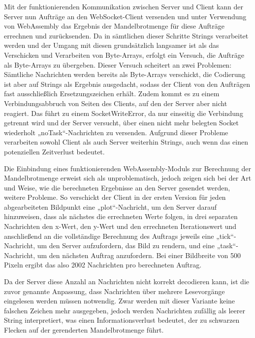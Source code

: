 \documentclass[12pt, onecolumn, notitlepage]{scrartcl}
\begin{document}
Mit der funktionierenden Kommunikation zwischen Server und Client kann der Server nun Aufträge an den WebSocket-Client versenden und unter Verwendung von WebAssembly das Ergebnis der Mandelbrotmenge für diese Aufträge errechnen und zurücksenden. Da in sämtlichen dieser Schritte Strings verarbeitet werden und der Umgang mit diesen grundsätzlich langsamer ist als das Verschicken und Verarbeiten von Byte-Arrays, erfolgt ein Versuch, die Aufträge als Byte-Arrays zu übergeben. Dieser Versuch scheitert an zwei Problemen: Sämtliche Nachrichten werden bereits als Byte-Arrays verschickt, die Codierung ist aber auf Strings als Ergebnis ausgedacht, sodass der Client von den Aufträgen fast ausschließlich Ersetzungszeichen erhält. Zudem kommt es zu einem Verbindungsabbruch von Seiten des Clients, auf den der Server aber nicht reagiert. Das führt zu einem SocketWriteError, da nur einseitig die Verbindung getrennt wird und der Server versucht, über einen nicht mehr belegten Socket wiederholt „noTask“-Nachrichten zu versenden. Aufgrund dieser Probleme verarbeiten sowohl Client als auch Server weiterhin Strings, auch wenn das einen potenziellen Zeitverlust bedeutet. \par

Die Einbindung eines funktionierenden WebAssembly-Moduls zur Berechnung der Mandelbrotmenge erweist sich als unproblematisch, jedoch zeigen sich bei der Art und Weise, wie die berechneten Ergebnisse an den Server gesendet werden, weitere Probleme. So verschickt der Client in der ersten Version für jeden abgearbeiteten Bildpunkt eine „plot“-Nachricht, um den Server darauf hinzuweisen, dass als nächstes die errechneten Werte folgen, in drei separaten Nachrichten den x-Wert, den y-Wert und den errechneten Iterationswert und anschließend an die vollständige Berechnung des Auftrags jeweils eine „tick“-Nachricht, um den Server aufzufordern, das Bild zu rendern, und eine „task“-Nachricht, um den nächsten Auftrag anzufordern. Bei einer Bildbreite von 500 Pixeln ergibt das also 2002 Nachrichten pro berechneten Auftrag. \par

Da der Server diese Anzahl an Nachrichten nicht korrekt decodieren kann, ist die zuvor genannte Anpassung, dass Nachrichten über mehrere Lesevorgänge eingelesen werden müssen notwendig. Zwar werden mit dieser Variante keine falschen Zeichen mehr ausgegeben, jedoch werden Nachrichten zufällig als leerer String interpretiert, was einen Informationsverlust bedeutet, der zu schwarzen Flecken auf der gerenderten Mandelbrotmenge führt. \par
\end{document}
